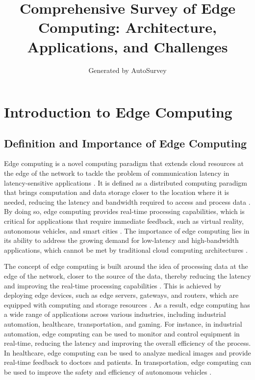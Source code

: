 \documentclass[11pt]{article}
\title{Comprehensive Survey of Edge Computing: Architecture, Applications, and Challenges}
\author{Generated by AutoSurvey}
\date{}
\begin{document}
\maketitle
\tableofcontents
\newpage

\section{Introduction to Edge Computing}

\subsection{Definition and Importance of Edge Computing}

Edge computing is a novel computing paradigm that extends cloud resources at the edge of the network to tackle the problem of communication latency in latency-sensitive applications \cite{ref1}. It is defined as a distributed computing paradigm that brings computation and data storage closer to the location where it is needed, reducing the latency and bandwidth required to access and process data \cite{ref2}. By doing so, edge computing provides real-time processing capabilities, which is critical for applications that require immediate feedback, such as virtual reality, autonomous vehicles, and smart cities \cite{ref3}. The importance of edge computing lies in its ability to address the growing demand for low-latency and high-bandwidth applications, which cannot be met by traditional cloud computing architectures \cite{ref4}.

The concept of edge computing is built around the idea of processing data at the edge of the network, closer to the source of the data, thereby reducing the latency and improving the real-time processing capabilities \cite{ref5}. This is achieved by deploying edge devices, such as edge servers, gateways, and routers, which are equipped with computing and storage resources \cite{ref6}. As a result, edge computing has a wide range of applications across various industries, including industrial automation, healthcare, transportation, and gaming. For instance, in industrial automation, edge computing can be used to monitor and control equipment in real-time, reducing the latency and improving the overall efficiency of the process. In healthcare, edge computing can be used to analyze medical images and provide real-time feedback to doctors and patients. In transportation, edge computing can be used to improve the safety and efficiency of autonomous vehicles \cite{ref7}.
\end{document}
